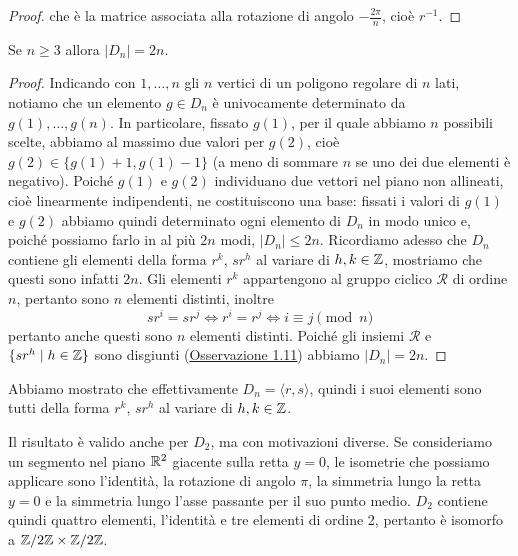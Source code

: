 \documentclass[11pt]{scrartcl}
\begin{document}
\begin{proof}
    che è la matrice associata alla rotazione di angolo $-\displaystyle
    \frac{2\pi}{n}$, cioè $r^{-1}$.
\end{proof}

\begin{proposition}
    Se $n \geqslant 3$ allora $|D_n| = 2n$.
\end{proposition}

\begin{proof}
    Indicando con $1, \ldots, n$ gli $n$ vertici di un poligono regolare di $n$ lati, notiamo
    che un elemento $g \in D_n$ è univocamente determinato da $g(1), \ldots, g(n)$.
    In particolare, fissato $g(1)$, per il quale abbiamo $n$ possibili scelte,
    abbiamo al massimo due valori per $g(2)$, cioè $g(2) \in \{g(1) + 1, g(1) - 1\}$
    (a meno di sommare $n$ se uno dei due elementi è negativo). Poiché $g(1)$
    e $g(2)$ individuano due vettori nel piano non allineati, cioè
    linearmente indipendenti, ne costituiscono una base: fissati i valori di 
    $g(1)$ e $g(2)$ abbiamo quindi determinato ogni
    elemento di $D_n$ in modo unico e, poiché possiamo farlo in al più $2n$ modi, 
    $|D_n| \leq 2n$. Ricordiamo adesso che $D_n$ contiene gli elementi
    della forma $r^k$, $sr^h$ al variare di $h, k \in \mathbb Z$, mostriamo che questi sono 
    infatti $2n$. Gli elementi $r^k$ appartengono al gruppo ciclico $\mathcal{R}$
    di ordine $n$, pertanto sono $n$ elementi distinti, inoltre 
    \[
        sr^i = sr^j \iff r^i = r^j\iff i \equiv j \pmod n
    \] pertanto anche questi sono $n$
    elementi distinti. Poiché gli insiemi $\mathcal{R}$ e 
    $\{sr^h\mid h \in \mathbb Z\}$ sono disgiunti (\hyperref[obs1.11]{Osservazione 1.11}) 
    abbiamo $|D_n| = 2n$.
\end{proof}

\begin{remark}
    Abbiamo mostrato che effettivamente $D_n = \langle r, s\rangle$, quindi i
    suoi elementi sono tutti della forma $r^k$, $sr^h$ al variare di $h, k \in \mathbb Z$. 
\end{remark}

\begin{remark}
    Il risultato è valido anche per $D_2$, ma con motivazioni diverse. 
    Se consideriamo un segmento nel piano $\mathbb R^2$ giacente sulla retta $y = 0$, 
    le isometrie che possiamo applicare sono l'identità, la rotazione di 
    angolo $\pi$, la simmetria lungo la retta $y = 0$ e la simmetria lungo l'asse
    passante per il suo punto medio. $D_2$ contiene quindi quattro elementi,
    l'identità e tre elementi di ordine 2, pertanto è isomorfo a $\mathbb{Z}/{2}\mathbb{Z}\times\mathbb{Z}/{2}\mathbb{Z}$.
\end{remark}
\end{document}
